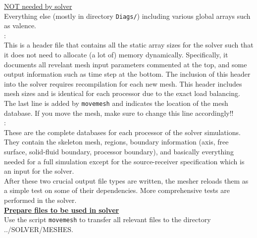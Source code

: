 \documentclass[11pt,letter,fleqn,english,notitlepage]{article}
\begin{document}
\noindent\underline{NOT needed by solver }\\
Everything else (mostly in directory {\tt Diags/}) including various global 
arrays such as valence.\\

: \\
This is a header file that contains all the static array sizes for the solver
such that it does not need to allocate (a lot of) memory dynamically.
Specifically, it documents all revelant mesh input parameters commented at the
top, and some output information such as time step at the bottom.  The
inclusion of this header into the solver requires recompilation for each new
mesh. This header includes mesh sizes and is identical for each processor due
to the exact load balancing.  The last line is added by {\tt movemesh} and
indicates the location of the mesh database. If you move the mesh, make sure to
change this line accordingly!!  \\

: \\
These are the complete databases for each processor of the solver simulations.
They contain the skeleton mesh, regions, boundary information (axis, free
surface, solid-fluid boundary, processor boundary), and basically everything
needed for a full simulation except for the source-receiver specification which
is an input for the solver. \\

\noindent After these two crucial output file types are written, the mesher
reloads them as a simple test on some of their dependencies. More comprehensive
tests are performed in the solver. \\

\noindent\textbf{\underline{Prepare files to be used in solver}}\\
Use the script {\tt movemesh} to transfer all relevant files to the directory
../SOLVER/MESHES. 
\end{document}
